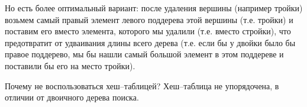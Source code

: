 \documentclass[a4paper,12pt]{article}
\theoremstyle{plain} %
\theoremstyle{definition} %
\theoremstyle{remark} %
\begin{document}
Но есть более оптимальный вариант: после удаления вершины (например тройки) возьмем самый правый элемент левого поддерева этой вершины (т.е. тройки) и поставим его вместо элемента, которого мы удалили (т.е. вместо стройки), что предотвратит от удваивания длины всего дерева (т.е. если бы у двойки было бы правое поддерево, мы бы нашли самый большой элемент в этом поддереве и поставили бы его на место тройки).

Почему не воспользоваться хеш--таблицей? Хеш--таблица не упорядочена, в отличии от двоичного дерева поиска.













\end{document}

